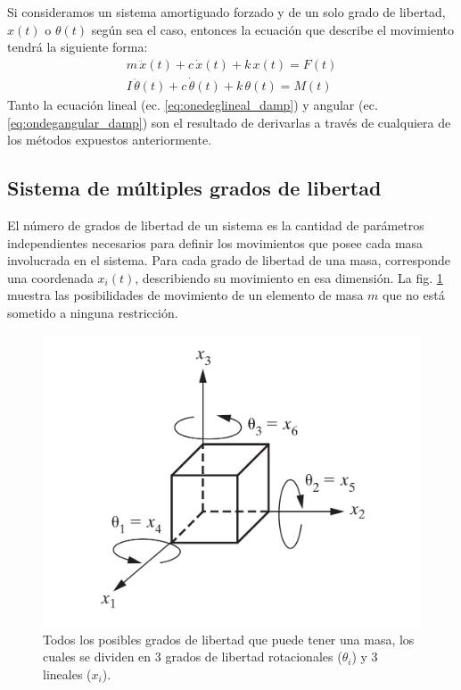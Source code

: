 Si consideramos un sistema amortiguado forzado y de un solo grado de libertad, $x(t)$ o $\theta(t)$ según sea el caso, entonces la ecuación que describe el movimiento tendrá la siguiente forma:
\begin{subequations}
\begin{align}
	m\,\ddot{x}(t) + c\,\dot{x}(t) + k\,x(t) = F(t) \label{eq:onedeglineal_damp}\\
	I\,\ddot{\theta}(t) + c\,\dot{\theta}(t) + k\,\theta(t) = M(t) \label{eq:ondegangular_damp}
\end{align}
\end{subequations}
Tanto la ecuación lineal (ec. \ref{eq:onedeglineal_damp}) y angular (ec. \ref{eq:ondegangular_damp}) son el resultado de derivarlas a través de cualquiera de los métodos expuestos anteriormente.  
 
\subsection{Sistema de múltiples grados de libertad}
El número de grados de libertad de un sistema es la cantidad de parámetros independientes necesarios para definir los movimientos que posee cada masa involucrada en el sistema. Para cada grado de libertad de una masa, corresponde una coordenada $x_i(t)$, describiendo su movimiento en esa dimensión. La fig. \ref{fig:dof} muestra las posibilidades de movimiento de un elemento de masa $m$ que no está sometido a ninguna restricción.

\begin{figure}[h]
\centering
\includegraphics[width=0.5\linewidth]{Imagenes/dof.pdf}
\caption{Todos los posibles grados de libertad que puede tener una masa, los cuales se dividen en 3 grados de libertad rotacionales ($\theta_i$) y 3 lineales ($x_i$). \cite{inman2014engineering}}
\label{fig:dof}
\end{figure}

